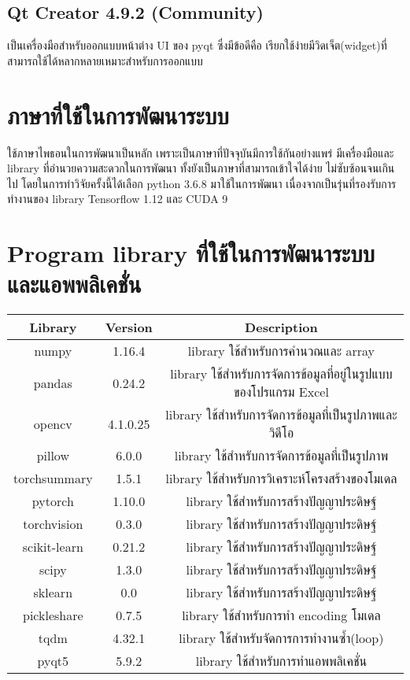 \subsection*{Qt Creator 4.9.2 (Community)}
เป็นเครื่องมือสำหรับออกแบบหน้าต่าง UI ของ pyqt ซึ่งมีข้อดีคือ เรียกใช้ง่ายมีวิดเจ็ต(widget)ที่สามารถใช้ได้หลากหลายเหมาะสำหรับการออกแบบ

\clearpage
\section{ภาษาที่ใช้ในการพัฒนาระบบ} 
	ใช้ภาษาไพธอนในการพัฒนาเป็นหลัก เพราะเป็นภาษาที่ปัจจุบันมีการใช้กันอย่างแพร่ มีเครื่องมือและ library ที่อำนวยความสะดวกในการพัฒนา 
	ทั้งยังเป็นภาษาที่สามารถเข้าใจได้ง่าย ไม่ซับซ้อนจนเกินไป โดยในการทำวิจัยครั้งนี้ได้เลือก python 3.6.8 มาใช้ในการพัฒนา 
	เนื่องจากเป็นรุ่นที่รองรับการทำงานของ library Tensorflow 1.12 และ CUDA 9

\vspace{3mm}
\section{Program library ที่ใช้ในการพัฒนาระบบและแอพพลิเคชั่น} 

\begin{tabular}{|c|c|c|}
		\hline
		{Library}&{Version}&{Description}\\
		\hline
		numpy	 			& 1.16.4		& library ใช้สำหรับการคำนวณและ array			\\
		pandas				& 0.24.2		& library ใช้สำหรับการจัดการข้อมูลที่อยู่ในรูปแบบของโปรแกรม Excel				\\
		opencv			 	& 4.1.0.25		& library ใช้สำหรับการจัดการข้อมูลที่เป็นรูปภาพและวิดีโอ		\\
		pillow				& 6.0.0			& library ใช้สำหรับการจัดการข้อมูลที่เป็นรูปภาพ			\\
		torchsummary		& 1.5.1			& library ใช้สำหรับการวิเคราะห์โครงสร้างของโมเดล 							\\
		pytorch		 		& 1.10.0		& library ใช้สำหรับการสร้างปัญญาประดิษฐ์							\\
		torchvision			& 0.3.0	 		& library ใช้สำหรับการสร้างปัญญาประดิษฐ์							\\
		scikit-learn		& 0.21.2		& library ใช้สำหรับการสร้างปัญญาประดิษฐ์							\\
		scipy				& 1.3.0			& library ใช้สำหรับการสร้างปัญญาประดิษฐ์							\\
		sklearn				& 0.0			& library ใช้สำหรับการสร้างปัญญาประดิษฐ์							\\
		pickleshare			& 0.7.5			& library ใช้สำหรับการทำ encoding โมเดล				\\
		tqdm				& 4.32.1		& library ใช้สำหรับจัดการการทำงานซ้ำ(loop)					\\
		pyqt5				& 5.9.2			& library ใช้สำหรับการทำแอพพลิเคชั่น					\\
		\hline
\end{tabular}



